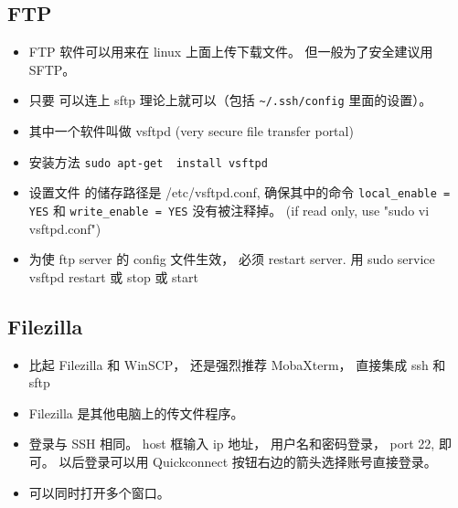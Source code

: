 
\subsection{FTP}
\begin{itemize}
\item FTP 软件可以用来在 linux 上面上传下载文件。 但一般为了安全建议用 SFTP。
\item 只要  可以连上 sftp 理论上就可以（包括 \verb`~/.ssh/config` 里面的设置）。
\item 其中一个软件叫做 vsftpd (very secure file transfer portal)
\item 安装方法 \verb`sudo apt-get  install vsftpd`
\item 设置文件 的储存路径是 /etc/vsftpd.conf, 确保其中的命令 \verb`local_enable = YES` 和 \verb`write_enable = YES`  没有被注释掉。
(if read only, use "sudo vi vsftpd.conf")
\item 为使 ftp server 的 config 文件生效， 必须 restart server. 用 sudo service vsftpd restart 或 stop 或 start
\end{itemize}

\subsection{Filezilla}
\begin{itemize}
\item 比起 Filezilla 和 WinSCP， 还是强烈推荐 MobaXterm， 直接集成 ssh 和 sftp
\item Filezilla 是其他电脑上的传文件程序。
\item 登录与 SSH 相同。 host 框输入 ip 地址， 用户名和密码登录， port 22, 即可。 以后登录可以用 Quickconnect 按钮右边的箭头选择账号直接登录。
\item 可以同时打开多个窗口。
\end{itemize}

